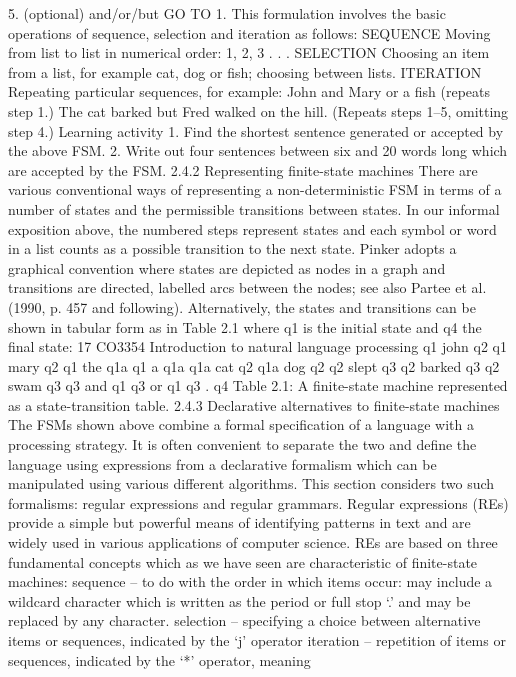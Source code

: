 5. (optional) and/or/but GO TO 1.
This formulation involves the basic operations of sequence, selection and iteration as
follows:
SEQUENCE
Moving from list to list in numerical order: 1, 2, 3 . . .
SELECTION
Choosing an item from a list, for example cat, dog or fish; choosing between lists.
ITERATION
Repeating particular sequences, for example:
John and Mary or a fish (repeats step 1.)
The cat barked but Fred walked on the hill. (Repeats steps 1–5, omitting step 4.)
Learning activity
1. Find the shortest sentence generated or accepted by the above FSM.
2. Write out four sentences between six and 20 words long which are accepted by the FSM.
2.4.2 Representing finite-state machines
There are various conventional ways of representing a non-deterministic FSM in
terms of a number of states and the permissible transitions between states. In our
informal exposition above, the numbered steps represent states and each symbol or
word in a list counts as a possible transition to the next state. Pinker adopts a
graphical convention where states are depicted as nodes in a graph and transitions
are directed, labelled arcs between the nodes; see also Partee et al. (1990, p. 457
and following). Alternatively, the states and transitions can be shown in tabular form
as in Table 2.1 where q1 is the initial state and q4 the final state:
17
CO3354 Introduction to natural language processing
q1 john q2
q1 mary q2
q1 the q1a
q1 a q1a
q1a cat q2
q1a dog q2
q2 slept q3
q2 barked q3
q2 swam q3
q3 and q1
q3 or q1
q3 . q4
Table 2.1: A finite-state machine represented as a state-transition table.
2.4.3 Declarative alternatives to finite-state machines
The FSMs shown above combine a formal specification of a language with a
processing strategy. It is often convenient to separate the two and define the
language using expressions from a declarative formalism which can be manipulated
using various different algorithms. This section considers two such formalisms:
regular expressions and regular grammars.
Regular expressions (REs) provide a simple but powerful means of identifying
patterns in text and are widely used in various applications of computer science. REs
are based on three fundamental concepts which as we have seen are characteristic of
finite-state machines:
sequence – to do with the order in which items occur: may include a wildcard
character which is written as the period or full stop ‘.’ and may be replaced by
any character.
selection – specifying a choice between alternative items or sequences, indicated by
the ‘j’ operator
iteration – repetition of items or sequences, indicated by the ‘*’ operator, meaning
